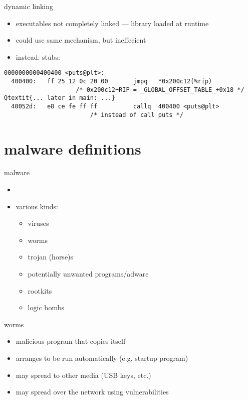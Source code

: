 \begin{frame}[fragile,label=dynamicStubs]{dynamic linking}
    \begin{itemize}
    \item executables not completely linked --- library loaded at runtime
    \item could use same mechanism, but ineffecient
    \item instead: stubs:
    \end{itemize}
\begin{Verbatim}[commandchars=Q\{\},fontsize=\fontsize{8}{9}\selectfont]
0000000000400400 <puts@plt>:
  400400:	ff 25 12 0c 20 00    	jmpq   *0x200c12(%rip) 
                    /* 0x200c12+RIP = _GLOBAL_OFFSET_TABLE_+0x18 */
Qtextit{... later in main: ...}
  40052d:	e8 ce fe ff ff       	callq  400400 <puts@plt>
                        /* instead of call puts */
\end{Verbatim}
\end{frame}

\section{malware definitions}

\begin{frame}{malware}
    \begin{itemize}
    \item {}
    \vspace{.5cm}
    \item various kinds:
        \begin{itemize}
        \item viruses
        \item worms
        \item trojan (horse)s
        \item potentially unwanted programs/adware
        \item rootkits
        \item logic bombs
        \end{itemize}
    \end{itemize}
\end{frame}

\begin{frame}{worms}
    \begin{itemize}
    \item malicious program that copies itself
    \item arranges to be run automatically (e.g. startup program)
    \item may spread to other media (USB keys, etc.)
    \item may spread over the network using vulnerabilities
    \end{itemize}
\end{frame}

